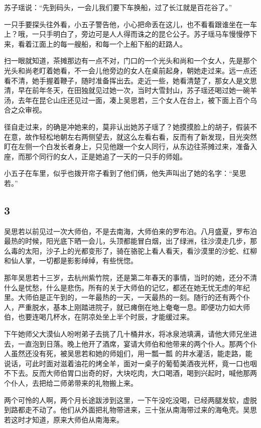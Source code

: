 苏子瑶说：“先到码头，一会儿我们要下车换船，过了长江就是百花谷了。”

一只手要探头往外看，小五子警告他，小心把命丢在这儿，也不看看跟谁坐在一车上？哦，一只手明白了，旁边可是人人得而诛之的昆仑公子。苏子瑶马车慢慢停下来，看着江面上的每一艘船，和每一个上船下船的赶路人。

扫一眼就知道，茶摊那边有一点不对，门口的一个光头和尚和一个女人，先是那个光头和尚老盯着她看，不一会儿他旁边的女人在桌前起身，朝她走过来。远一点还看不清，她手握着鞭子，随时准备挥出去。走近一些，她看清楚了，那女人是文思清，早在前年冬天，在田独就见过她一次，当时大雪封山，苏子瑶还喝过她一碗羊汤，去年在昆仑山庄还见过一面，凑上吴思若，三个女人在台上，被下面上百个乌合之众审视。

径自走过来，的确是冲她来的，莫非认出她苏子瑶了？她摸摸脸上的胡子，假装不在意，故作轻松地朝左右两侧望去，就这么左看右看，反而有了新发现，目光突然盯在左侧一个白发长者身上，只见他跟一个女人同行，从东边往茶摊过来，准备入座，而那个同行的女人，正是她追了一天的一只手的师姐。

小五子在车里，似乎也拨开帘子看到了他们俩，他失声叫出了她的名字：“吴思若。”
\newline

{\centering\subsection{3}}

吴思若以前见过一次大师伯，不是去南海，大师伯来的罗布泊。八月盛夏，罗布泊最热的时候，阳光底下晒一会儿，头顶都能冒白烟，出了绿洲，往沙漠走几步，那么毒的太阳，沙子上的光都变形了，骑在骆驼上看人看天，看沙漠里的沙蛇、红柳和仙人掌，一切都是影影绰绰，有些恍惚。

那年吴思若十三岁，去杭州紫竹院，还是第二年春天的事情，当时的她，还分不清什么是忧愁，什么是悲伤。所有的关于大师伯的记忆，都还在她无忧无虑的年纪里。大师伯是正午到的，一年最热的一天，一天最热的一刻。随行的还有两个仆人，严重脱水，基本上刚踏进院子，就已瘫倒在地上奄奄一息。即便功力如大师伯，也要连喝几杯水，在阴凉处坐上半个时辰，才能缓过来。

下午她师父大漠仙人吩咐弟子去挑了几十桶井水，将冰泉池填满，请他大师兄坐进去，一直泡到日落。晚上他开了酒席，宴请大师伯和他带来的两个仆人。那两个仆人虽然还没有死，被吴思若和她的师姐们，用一瓢一瓢
的井水灌活，能走路，能说话，可此时面对滋着油花的烤全羊，面对一桌子的葡萄美酒夜光杯，竟一口也咽不下去。反而大师伯胃口出奇的好，大块吃肉，大口喝酒，喝到兴起时，喊他那两个仆人，去把给二师弟带来的礼物搬上来。

两个可怜的人啊，两个月长途跋涉到这里，一下午没吃没喝，已经两腿发软，虚脱到路都走不动了。他们从外面把礼物带进来，三十张从南海带过来的海龟壳。吴思若这时才知道，原来大师伯从南海来。

